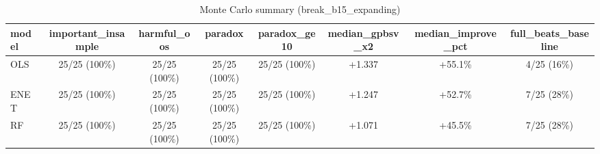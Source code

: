 \begin{table}
\centering
\caption{Monte Carlo summary (break_b15_expanding)}
\label{tab:break_b15_expanding}
\begin{tabular}{lccccccc}
\toprule
model & important_insample &    harmful_oos &        paradox &   paradox_ge10 & median_gpbsv_x2 & median_improve_pct & full_beats_baseline \\
\midrule
  OLS &      25/25 (100\%) &  25/25 (100\%) &  25/25 (100\%) &  25/25 (100\%) &          +1.337 &            +55.1\% &         4/25 (16\%) \\
 ENET &      25/25 (100\%) &  25/25 (100\%) &  25/25 (100\%) &  25/25 (100\%) &          +1.247 &            +52.7\% &         7/25 (28\%) \\
   RF &      25/25 (100\%) &  25/25 (100\%) &  25/25 (100\%) &  25/25 (100\%) &          +1.071 &            +45.5\% &         7/25 (28\%) \\
\bottomrule
\end{tabular}
\end{table}
